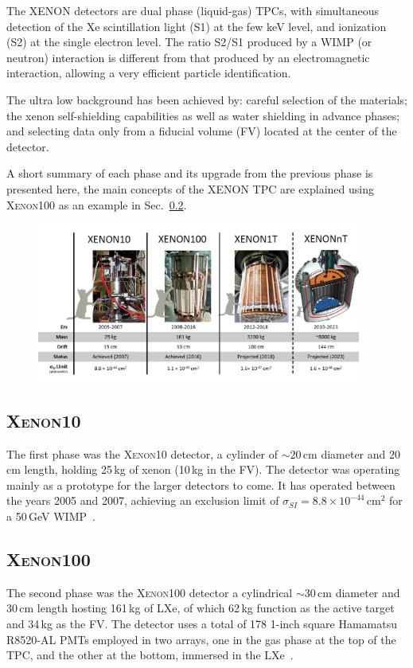 The XENON detectors are dual phase (liquid-gas) TPCs, with simultaneous
detection of the Xe scintillation light (S1) at the few keV level, and ionization (S2) at the single electron level. The ratio S2/S1 produced by a WIMP (or neutron) interaction is different from that produced by an electromagnetic interaction, allowing a very efficient particle identification.

The ultra low background has been achieved by: careful selection of the materials; the xenon self-shielding capabilities as well as water shielding in advance phases; and selecting data only from a fiducial volume (FV) located at the center of the detector.

A short summary of each phase and its upgrade from the previous phase is presented here, the main concepts of the XENON TPC are explained using \textsc{Xenon100} as an example in Sec.~\ref{sec:xe100}.


\begin{figure}[t!]
	\centering
	\includegraphics[width=0.95\textwidth]{figs/XePhases.png}
	\label{fig:XenonProg}
\end{figure}


\subsection{\textsc{Xenon10}}
\label{sec:xe10}

The first phase was the \textsc{Xenon10} detector, a cylinder of $\sim 20$\,cm diameter and $20$\,cm length, holding 25\,kg of xenon (10\,kg in the FV). The detector was operating mainly as a prototype for the larger detectors to come. It has operated between the years 2005 and 2007, achieving an exclusion limit of $\sigma_{SI} = 8.8 \times 10^{-44}$\,cm$^2$ for a 50\,GeV WIMP~\cite{Angle:2007uj}.

\subsection{\textsc{Xenon100}}
\label{sec:xe100}
The second phase was the \textsc{Xenon100} detector a cylindrical $\sim 30$\,cm diameter and $30$\,cm length hosting 161\,kg of LXe, of which 62\,kg function as the active target and 34\,kg as the FV. The detector uses a total of 178 1-inch square Hamamatsu R8520-AL PMTs employed in two arrays, one in the gas phase at the top of the TPC, and the other at the bottom, immersed in the LXe~\cite{xe100_instr2012}.

